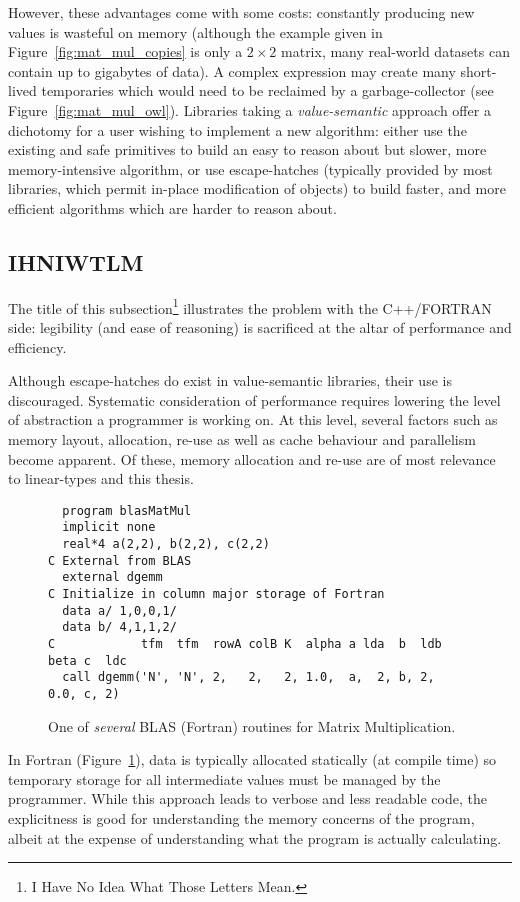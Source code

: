However, these advantages come with some costs: constantly producing new values
is wasteful on memory (although the example given in
Figure~\ref{fig:mat_mul_copies} is only a $2 \times 2$ matrix, many real-world
datasets can contain up to gigabytes of data). A complex expression may create
many short-lived temporaries which would need to be reclaimed by a
garbage-collector (see Figure~\ref{fig:mat_mul_owl}). Libraries taking a
\emph{value-semantic} approach offer a dichotomy for a user wishing to
implement a new algorithm: either use the existing and safe primitives to build
an easy to reason about but slower, more memory-intensive algorithm, or use
escape-hatches (typically provided by most libraries, which permit in-place
modification of objects) to build faster, and more efficient algorithms which
are harder to reason about.

\subsection{IHNIWTLM}
The title of this subsection\footnote{I Have No Idea What Those Letters Mean.}
illustrates the problem with the C++/FORTRAN side: legibility (and ease of
reasoning) is sacrificed at the altar of performance and efficiency.

Although escape-hatches do exist in value-semantic libraries, their use is
discouraged. Systematic consideration of performance requires lowering the
level of abstraction a programmer is working on. At this level, several
factors such as memory layout, allocation, re-use as well as cache behaviour
and parallelism become apparent. Of these, memory allocation and re-use are
of most relevance to linear-types and this thesis.

\begin{figure}[tbp]
    \begin{verbatim}
  program blasMatMul
  implicit none
  real*4 a(2,2), b(2,2), c(2,2)
C External from BLAS
  external dgemm
C Initialize in column major storage of Fortran
  data a/ 1,0,0,1/
  data b/ 4,1,1,2/
C            tfm  tfm  rowA colB K  alpha a lda  b  ldb beta c  ldc
  call dgemm('N', 'N', 2,   2,   2, 1.0,  a,  2, b, 2,  0.0, c, 2)
    \end{verbatim}
    \caption{One of \emph{several} BLAS (Fortran) routines for Matrix
    Multiplication.}\label{fig:fortran_blas}
\end{figure}

In Fortran (Figure~\ref{fig:fortran_blas}), data is typically allocated
statically (at compile time) so temporary storage for all intermediate values
must be managed by the programmer. While this approach leads to verbose and
less readable code, the explicitness is good for understanding the memory
concerns of the program, albeit at the expense of understanding what the
program is actually calculating.

